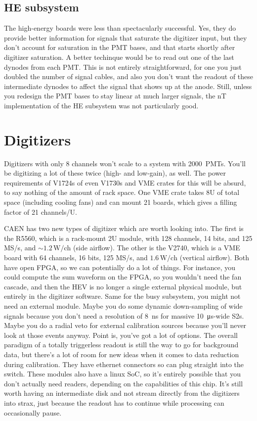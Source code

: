 \subsection{HE subsystem}

The high-energy boards were less than spectacularly successful.
Yes, they do provide better information for signals that saturate the digitizer input, but they don't account for saturation in the PMT bases, and that starts shortly after digitizer saturation.
A better techinque would be to read out one of the last dynodes from each PMT.
This is not entirely straightforward, for one you just doubled the number of signal cables, and also you don't want the readout of these intermediate dynodes to affect the signal that shows up at the anode.
Still, unless you redesign the PMT bases to stay linear at much larger signals, the nT implementation of the HE subsystem was not particularly good.

\section{Digitizers}

Digitizers with only 8 channels won't scale to a system with 2000~PMTs.
You'll be digitizing a lot of these twice (high- and low-gain), as well.
The power requirements of V1724s of even V1730s and VME crates for this will be absurd, to say nothing of the amount of rack space.
One VME crate takes 8U of total space (including cooling fans) and can mount 21 boards, which gives a filling factor of 21 channels/U.

CAEN has two new types of digitizer which are worth looking into.
The first is the R5560, which is a rack-mount 2U module, with 128 channels, 14 bits, and 125 MS/s, and $\sim1.2\,\mathrm{W/ch}$ (side airflow).
The other is the V2740, which is a VME board with 64 channels, 16 bits, 125 MS/s, and $1.6\,\mathrm{W/ch}$ (vertical airflow).
Both have open FPGA, so we can potentially do a lot of things.
For instance, you could compute the sum waveform on the FPGA, so you wouldn't need the fan cascade, and then the HEV is no longer a single external physical module, but entirely in the digitizer software.
Same for the busy subsystem, you might not need an external module.
Maybe you do some dynamic down-sampling of wide signals because you don't need a resolution of \SI{8}{\nano\second} for massive \SI{10}{\micro\second}-wide S2s.
Maybe you do a radial veto for external calibration sources because you'll never look at those events anyway.
Point is, you've got a lot of options.
The overall paradigm of a totally triggerless readout is still the way to go for background data, but there's a lot of room for new ideas when it comes to data reduction during calibration.
They have ethernet connectors so can plug straight into the switch.
These modules also have a linux SoC, so it's entirely possible that you don't actually need readers, depending on the capabilities of this chip.
It's still worth having an intermediate disk and not stream directly from the digitizers into strax, just because the readout has to continue while processing can occasionally pause.

